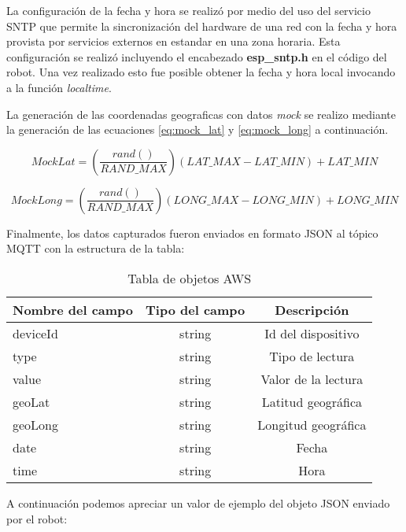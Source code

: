 La configuración de la fecha y hora se realizó por medio del uso del servicio SNTP \citep{sntp} que permite la sincronización del hardware de una red con la fecha y hora provista por servicios externos en estandar en una zona horaria. Esta configuración se realizó incluyendo el encabezado \textbf{esp\_sntp.h} en el código del robot. Una vez realizado esto fue posible obtener la fecha y hora local invocando a la función \textit{localtime}.

La generación de las coordenadas geograficas con datos \textit{mock} se realizo mediante la generación de las ecuaciones \ref{eq:mock_lat} y \ref{eq:mock_long} a continuación.

\begin{equation}
	\label{eq:mock_lat}
	MockLat = \left( \frac{rand()}{RAND\_MAX} \right) \left( LAT\_MAX - LAT\_MIN \right) + LAT\_MIN
\end{equation}
                
\begin{equation}
	\label{eq:mock_long}
	MockLong = \left( \frac{rand()}{RAND\_MAX} \right) \left( LONG\_MAX - LONG\_MIN \right) + LONG\_MIN
\end{equation}

Finalmente, los datos capturados fueron enviados en formato JSON al tópico MQTT con la estructura de la tabla:


\begin{table}[h]
	\centering
	\caption[caption corto]{Tabla de objetos AWS}
	\begin{tabular}{l c c}    
		\toprule
		\textbf{Nombre del campo} & \textbf{Tipo del campo} & \textbf{Descripción}  \\
		\midrule
		deviceId & string & Id del dispositivo \\		
		type & string & Tipo de lectura \\		
		value & string & Valor de la lectura \\		
		geoLat & string & Latitud geográfica \\		
		geoLong & string & Longitud geográfica\\		
		date & string & Fecha \\		
		time & string & Hora \\		
		
		\bottomrule
		\hline
	\end{tabular}
	\label{tab:json_fields}
\end{table}


A continuación podemos apreciar un valor de ejemplo del objeto JSON enviado por el robot:

